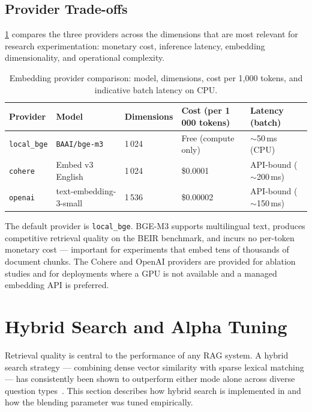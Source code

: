 \subsection{Provider Trade-offs}

\cref{tab:embedding_providers} compares the three providers across the
dimensions that are most relevant for research experimentation: monetary cost,
inference latency, embedding dimensionality, and operational complexity.

\begin{table}[htbp]
  \centering
  \caption[Comparison of embedding providers supported by \medrag{}.]{Embedding provider comparison: model, dimensions, cost per 1,000 tokens, and indicative batch latency on CPU.}
  \label{tab:embedding_providers}
  \begin{tabularx}{\textwidth}{lXXXX}
    \toprule
    \textbf{Provider} & \textbf{Model} & \textbf{Dimensions} &
    \textbf{Cost (per 1\,000 tokens)} & \textbf{Latency (batch)} \\
    \midrule
    \texttt{local\_bge} & \texttt{BAAI/bge-m3}
      & 1\,024 & Free (compute only) & $\sim$50\,ms (CPU) \\
    \texttt{cohere}     & Embed v3 English
      & 1\,024 & \$0.0001 & API-bound ($\sim$200\,ms) \\
    \texttt{openai}     & text-embedding-3-small
      & 1\,536 & \$0.00002 & API-bound ($\sim$150\,ms) \\
    \bottomrule
  \end{tabularx}
\end{table}

The default provider is \texttt{local\_bge}.  BGE-M3 supports multilingual
text, produces competitive retrieval quality on the BEIR benchmark, and incurs
no per-token monetary cost — important for experiments that embed tens of
thousands of document chunks.  The Cohere and OpenAI providers are provided for
ablation studies and for deployments where a GPU is not available and a
managed embedding API is preferred.

\section{Hybrid Search and Alpha Tuning}
\label{sec:hybrid_search}

Retrieval quality is central to the performance of any RAG system.  A hybrid
search strategy — combining dense vector similarity with sparse lexical
matching — has consistently been shown to outperform either mode alone across
diverse question types~\cite{thakur2021beir}.  This section describes how
hybrid search is implemented in \medrag{} and how the blending parameter was
tuned empirically.

